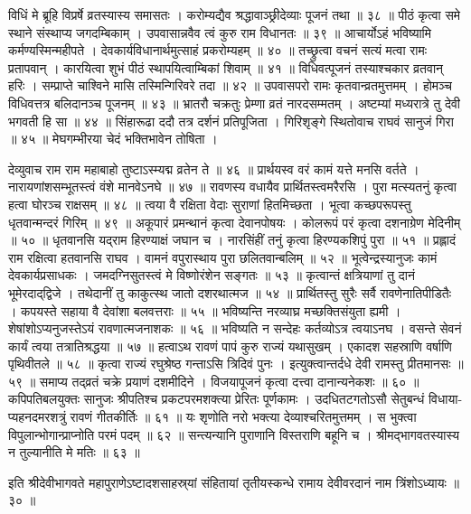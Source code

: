 विधिं मे ब्रूहि विप्रर्षे व्रतस्यास्य समासतः ।
करोम्यद्यैव श्रद्धावाञ्छ्रीदेव्याः पूजनं तथा ॥ ३८ ॥
पीठं कृत्वा समे स्थाने संस्थाप्य जगदम्बिकाम् ।
उपवासान्नवैव त्वं कुरु राम विधानतः ॥ ३९ ॥
आचार्योऽहं भविष्यामि कर्मण्यस्मिन्महीपते ।
देवकार्यविधानार्थमुत्साहं प्रकरोम्यहम् ॥ ४० ॥
तच्छ्रुत्वा वचनं सत्यं मत्वा रामः प्रतापवान् ।
कारयित्वा शुभं पीठं स्थापयित्वाम्बिकां शिवाम् ॥ ४१ ॥
विधिवत्पूजनं तस्याश्चकार व्रतवान् हरिः ।
सम्प्राप्ते चाश्विने मासि तस्मिन्गिरिवरे तदा ॥ ४२ ॥
उपवासपरो रामः कृतवान्व्रतमुत्तमम् ।
होमञ्च विधिवत्तत्र बलिदानञ्च पूजनम् ॥ ४३ ॥
भ्रातरौ चक्रतुः प्रेम्णा व्रतं नारदसम्मतम् ।
अष्टम्यां मध्यरात्रे तु देवी भगवती हि सा ॥ ४४ ॥
सिंहारूढा ददौ तत्र दर्शनं प्रतिपूजिता ।
गिरिशृङ्गे स्थितोवाच राघवं सानुजं गिरा ॥ ४५ ॥
मेघगम्भीरया चेदं भक्तिभावेन तोषिता ।

देव्युवाच
राम राम महाबाहो तुष्टाऽस्म्यद्म व्रतेन ते ॥ ४६ ॥
प्रार्थयस्व वरं कामं यत्ते मनसि वर्तते ।
नारायणांशसम्भूतस्त्वं वंशे मानवेऽनघे ॥ ४७ ॥
रावणस्य वधायैव प्रार्थितस्त्वमरैरसि ।
पुरा मत्स्यतनुं कृत्वा हत्वा घोरञ्च राक्षसम् ॥ ४८ ॥
त्वया वै रक्षिता वेदाः सुराणां हितमिच्छता ।
भूत्वा कच्छपरूपस्तु धृतवान्मन्दरं गिरिम् ॥ ४९ ॥
अकूपारं प्रमन्थानं कृत्वा देवानपोषयः ।
कोलरूपं परं कृत्वा दशनाग्रेण मेदिनीम् ॥ ५० ॥
धृतवानसि यद्‌राम हिरण्याक्षं जघान च ।
नारसिंहीं तनुं कृत्वा हिरण्यकशिपुं पुरा ॥ ५१ ॥
प्रह्लादं राम रक्षित्वा हतवानसि राघव ।
वामनं वपुरास्थाय पुरा छलितवान्बलिम् ॥ ५२ ॥
भूत्वेन्द्रस्यानुजः कामं देवकार्यप्रसाधकः ।
जमदग्निसुतस्त्वं मे विष्णोरंशेन सङ्गतः ॥ ५३ ॥
कृत्वान्तं क्षत्रियाणां तु दानं भूमेरदाद्‌द्विजे ।
तथेदानीं तु काकुत्स्थ जातो दशरथात्मज ॥ ५४ ॥
प्रार्थितस्तु सुरैः सर्वै रावणेनातिपीडितैः ।
कपयस्ते सहाया वै देवांशा बलवत्तराः ॥ ५५ ॥
भविष्यन्ति नरव्याघ्र मच्छक्तिसंयुता ह्यमी ।
शेषांशोऽप्यनुजस्तेऽयं रावणात्मजनाशकः ॥ ५६ ॥
भविष्यति न सन्देहः कर्तव्योऽत्र त्वयाऽनघ ।
वसन्ते सेवनं कार्यं त्वया तत्रातिश्रद्धया ॥ ५७ ॥
हत्वाऽथ रावणं पापं कुरु राज्यं यथासुखम् ।
एकादश सहस्राणि वर्षाणि पृथिवीतले ॥ ५८ ॥
कृत्वा राज्यं रघुश्रेष्ठ गन्ताऽसि त्रिदिवं पुनः ।
इत्युक्त्वान्तर्दधे देवी रामस्तु प्रीतमानसः ॥ ५९ ॥
समाप्य तद्‌व्रतं चक्रे प्रयाणं दशमीदिने ।
विजयापूजनं कृत्वा दत्त्वा दानान्यनेकशः ॥ ६० ॥
कपिपतिबलयुक्तः सानुजः श्रीपतिश्च
     प्रकटपरमशक्त्या प्रेरितः पूर्णकामः ।
उदधितटगतोऽसौ सेतुबन्धं विधाया-
     प्यहनदमरशत्रुं रावणं गीतकीर्तिः ॥ ६१ ॥
यः शृणोति नरो भक्त्या देव्याश्चरितमुत्तमम् ।
स भुक्त्वा विपुलान्भोगान्प्राप्नोति परमं पदम् ॥ ६२ ॥
सन्त्यन्यानि पुराणानि विस्तराणि बहूनि च ।
श्रीमद्‌भागवतस्यास्य न तुल्यानीति मे मतिः ॥ ६३ ॥

इति श्रीदेवीभागवते महापुराणेऽष्टादशसाहस्र्यां संहितायां तृतीयस्कन्धे रामाय देवीवरदानं नाम त्रिंशोऽध्यायः ॥ ३० ॥